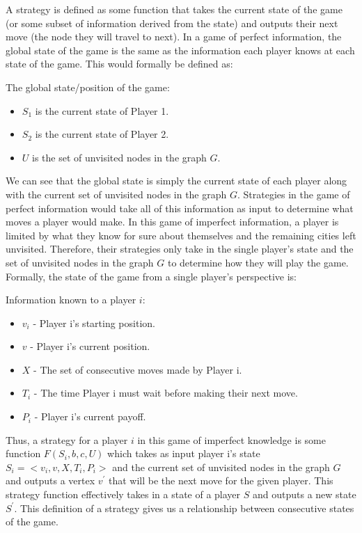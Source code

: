 \documentclass[12pt]{article}%
\begin{document}
	A strategy is defined as some function that takes the current state of the game (or some subset of information derived from the state) and outputs their next move (the node they will travel to next). In a game of perfect information, the global state of the game is the same as the information each player knows at each state of the game. This would formally be defined as:\newline
	
	The global state/position of the game:\newline
	
	\begin{itemize}
		\item $S_{1}$ is the current state of Player 1.
		\item $S_{2}$ is the current state of Player 2.
		\item $U$ is the set of unvisited nodes in the graph $G$.
	\end{itemize}
	 
	We can see that the global state is simply the current state of each player along with the current set of unvisited nodes in the graph $G$. Strategies in the game of perfect information would take all of this information as input to determine what moves a player would make. In this game of imperfect information, a player is limited by what they know for sure about themselves and the remaining cities left unvisited. Therefore, their strategies only take in the single player's state and the set of unvisited nodes in the graph $G$ to determine how they will play the game. Formally, the state of the game from a single player's perspective is:\newpage
	
	Information known to a player $i$:\newline
	
	\begin{itemize}
		\item $v_{i}$ - Player i's starting position.
		\item $v$ - Player i's current position.
		\item $X$ - The set of consecutive moves made by Player i.
		\item $T_{i}$ - The time Player i must wait before making their next move.
		\item $P_{i}$ - Player i's current payoff.
	\end{itemize}

 Thus, a strategy for a player $i$ in this game of imperfect knowledge is some function $F(S_{i}, b, c, U)$ which takes as input player i's state $S_{i} = <v_{i}, v, X, T_{i}, P_{i}>$ and the current set of unvisited nodes in the graph $G$  and outputs a vertex $v^{\prime}$ that will be the next move for the given player. This strategy function effectively takes in a state of a player $S$ and outputs a new state $S^{\prime}$. This definition of a strategy gives us a relationship between consecutive states of the game.\par
 
\end{document}
